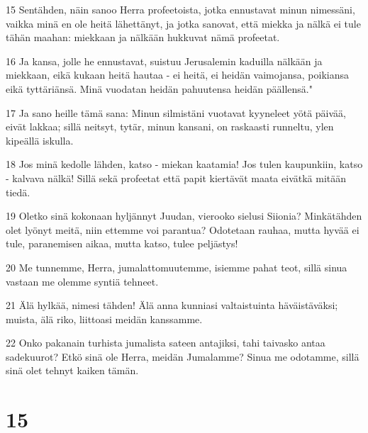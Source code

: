 \par 15 Sentähden, näin sanoo Herra profeetoista, jotka ennustavat minun nimessäni, vaikka minä en ole heitä lähettänyt, ja jotka sanovat, että miekka ja nälkä ei tule tähän maahan: miekkaan ja nälkään hukkuvat nämä profeetat.
\par 16 Ja kansa, jolle he ennustavat, suistuu Jerusalemin kaduilla nälkään ja miekkaan, eikä kukaan heitä hautaa - ei heitä, ei heidän vaimojansa, poikiansa eikä tyttäriänsä. Minä vuodatan heidän pahuutensa heidän päällensä."
\par 17 Ja sano heille tämä sana: Minun silmistäni vuotavat kyyneleet yötä päivää, eivät lakkaa; sillä neitsyt, tytär, minun kansani, on raskaasti runneltu, ylen kipeällä iskulla.
\par 18 Jos minä kedolle lähden, katso - miekan kaatamia! Jos tulen kaupunkiin, katso - kalvava nälkä! Sillä sekä profeetat että papit kiertävät maata eivätkä mitään tiedä.
\par 19 Oletko sinä kokonaan hyljännyt Juudan, vierooko sielusi Siionia? Minkätähden olet lyönyt meitä, niin ettemme voi parantua? Odotetaan rauhaa, mutta hyvää ei tule, paranemisen aikaa, mutta katso, tulee peljästys!
\par 20 Me tunnemme, Herra, jumalattomuutemme, isiemme pahat teot, sillä sinua vastaan me olemme syntiä tehneet.
\par 21 Älä hylkää, nimesi tähden! Älä anna kunniasi valtaistuinta häväistäväksi; muista, älä riko, liittoasi meidän kanssamme.
\par 22 Onko pakanain turhista jumalista sateen antajiksi, tahi taivasko antaa sadekuurot? Etkö sinä ole Herra, meidän Jumalamme? Sinua me odotamme, sillä sinä olet tehnyt kaiken tämän.

\chapter{15}

